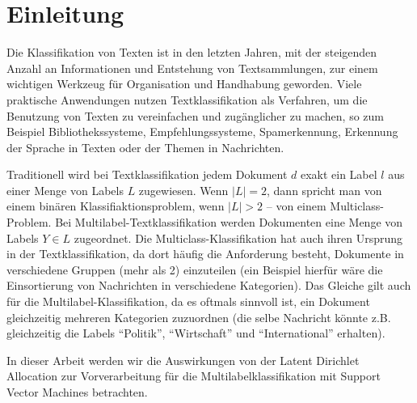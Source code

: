 \section{Einleitung}

\begin{comment}
Einführung und Einbettung des Problems
Was ist die konkrete Problemstellung / Fragestellung der Arbeit
Literature Review
\end{comment}

Die Klassifikation von Texten ist in den letzten Jahren, mit der steigenden Anzahl an Informationen und Entstehung von Textsammlungen, zur einem wichtigen Werkzeug für Organisation und Handhabung geworden.
Viele praktische Anwendungen nutzen Textklassifikation als Verfahren, um die Benutzung von Texten zu vereinfachen und zugänglicher zu machen, so zum Beispiel Bibliothekssysteme, Empfehlungssysteme, Spamerkennung, Erkennung der Sprache in Texten oder der Themen in Nachrichten.

Traditionell wird bei Textklassifikation jedem Dokument $d$ exakt ein Label $l$ aus einer Menge von Labels $L$ zugewiesen.
Wenn $|L| = 2$, dann spricht man von einem binären Klassifiaktionsproblem, wenn $|L| > 2$ -- von einem Multiclass-Problem.
Bei Multilabel-Textklassifikation werden Dokumenten eine Menge von Labels $Y \in L$ zugeordnet.
Die Multiclass-Klassifikation hat auch ihren Ursprung in der Textklassifikation, da dort häufig die Anforderung besteht, Dokumente in verschiedene Gruppen (mehr als 2) einzuteilen (ein Beispiel hierfür wäre die Einsortierung von Nachrichten in verschiedene Kategorien).
Das Gleiche gilt auch für die Multilabel-Klassifikation, da es oftmals sinnvoll ist, ein Dokument gleichzeitig mehreren Kategorien zuzuordnen (die selbe Nachricht könnte z.B. gleichzeitig die Labels ``Politik'', ``Wirtschaft'' und ``International'' erhalten).

In dieser Arbeit werden wir die Auswirkungen von der Latent Dirichlet Allocation zur Vorverarbeitung für die Multilabelklassifikation mit Support Vector Machines betrachten.


